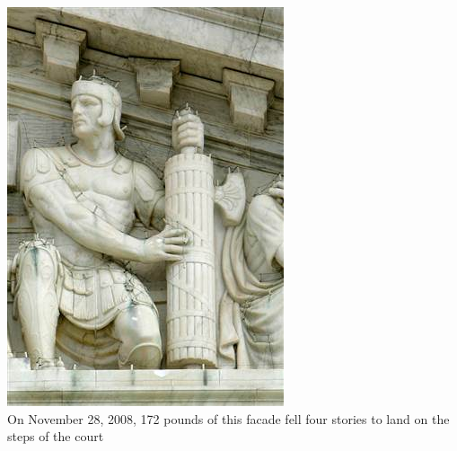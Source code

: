 \begin{frame}
    \centering
    \includegraphics[height=.85\textheight]{img/fasces_west_supcourt.jpg} \\
    \large{ On November 28, 2008, 172 pounds of this facade fell four stories to land on the steps of the court } \\
\end{frame}

